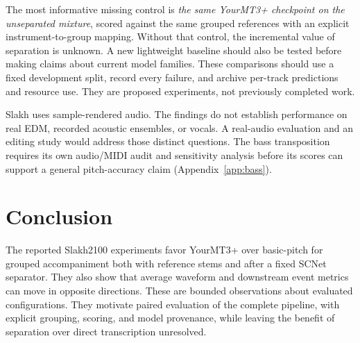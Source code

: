 \documentclass[11pt]{article}
\begin{document}
The most informative missing control is \emph{the same YourMT3+ checkpoint on
the unseparated mixture}, scored against the same grouped references with an
explicit instrument-to-group mapping. Without that control, the incremental value
of separation is unknown. A new lightweight baseline should also be tested before
making claims about current model families. These comparisons should use a fixed
development split, record every failure, and archive per-track predictions and
resource use. They are proposed experiments, not previously completed work.

Slakh uses sample-rendered audio. The findings do not establish performance on real
EDM, recorded acoustic ensembles, or vocals. A real-audio evaluation and an editing
study would address those distinct questions. The bass transposition requires its
own audio/MIDI audit and sensitivity analysis before its scores can support a
general pitch-accuracy claim (Appendix~\ref{app:bass}).

\section{Conclusion}
The reported Slakh2100 experiments favor YourMT3+ over basic-pitch for grouped
accompaniment both with reference stems and after a fixed SCNet separator. They
also show that average waveform and downstream event metrics can move in opposite
directions. These are bounded observations about evaluated configurations. They
motivate paired evaluation of the complete pipeline, with explicit grouping,
scoring, and model provenance, while leaving the benefit of separation over direct
transcription unresolved.
\end{document}
